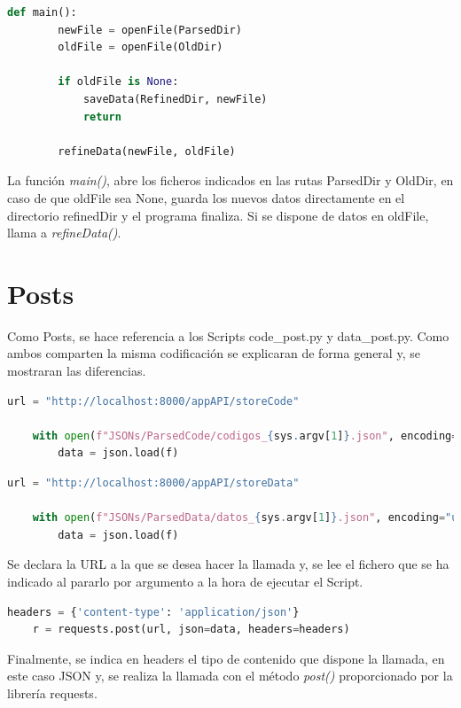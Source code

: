 \begin{lstlisting}[language=Python, caption={Declaración rutas JSONs}]
	def main():
		newFile = openFile(ParsedDir)
		oldFile = openFile(OldDir)
		
		if oldFile is None:
			saveData(RefinedDir, newFile)
			return
		
		refineData(newFile, oldFile)
\end{lstlisting}

La función \textit{main()}, abre los ficheros indicados en las rutas ParsedDir y OldDir, en caso de que oldFile sea None, guarda los nuevos datos directamente en el directorio refinedDir y el programa finaliza. Si se dispone de datos en oldFile, llama a \textit{refineData()}.

\section{Posts}
Como Posts, se hace referencia a los Scripts code\_post.py y data\_post.py. Como ambos comparten la misma codificación se explicaran de forma general y, se mostraran las diferencias.

\begin{lstlisting}[language=Python, caption={Declaración variables code\_post.py}]
	url = "http://localhost:8000/appAPI/storeCode"
	
	with open(f"JSONs/ParsedCode/codigos_{sys.argv[1]}.json", encoding="utf-8") as f:
		data = json.load(f)
\end{lstlisting}

\begin{lstlisting}[language=Python, caption={Declaración variables data\_post.py}]
	url = "http://localhost:8000/appAPI/storeData"
	
	with open(f"JSONs/ParsedData/datos_{sys.argv[1]}.json", encoding="utf-8") as f:
		data = json.load(f)
\end{lstlisting}

Se declara la URL a la que se desea hacer la llamada y, se lee el fichero que se ha indicado al pararlo por argumento a la hora de ejecutar el Script.

\begin{lstlisting}[language=Python, caption={Llamada POST}]
	headers = {'content-type': 'application/json'}
	r = requests.post(url, json=data, headers=headers)
\end{lstlisting}

Finalmente, se indica en headers el tipo de contenido que dispone la llamada, en este caso JSON y, se realiza la llamada con el método \textit{post()} proporcionado por la librería requests.
